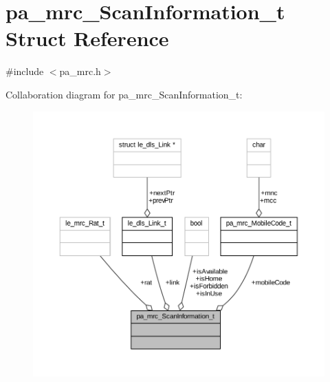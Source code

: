 \hypertarget{structpa__mrc___scan_information__t}{}\section{pa\+\_\+mrc\+\_\+\+Scan\+Information\+\_\+t Struct Reference}
\label{structpa__mrc___scan_information__t}


{\ttfamily \#include $<$pa\+\_\+mrc.\+h$>$}



Collaboration diagram for pa\+\_\+mrc\+\_\+\+Scan\+Information\+\_\+t\+:
\nopagebreak
\begin{figure}[H]
\begin{center}
\leavevmode
\includegraphics[width=350pt]{structpa__mrc___scan_information__t__coll__graph}
\end{center}
\end{figure}
